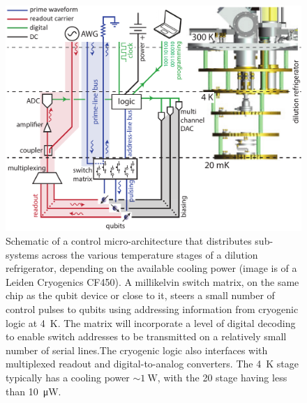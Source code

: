 \begin{figure}
\centering
\includegraphics[width=0.8\linewidth]{Fig1_arch}
\caption[Schematic of a control micro-architecture]{\label{fig:DRstages}Schematic of a control micro-architecture that distributes sub-systems across the various temperature stages of a dilution refrigerator, depending on the available cooling power (image is of a Leiden Cryogenics CF450). A millikelvin switch matrix, on the same chip as the qubit device or close to it, steers a small number of control pulses to qubits using addressing information from cryogenic logic at \SI{4}{\kelvin}. The matrix will incorporate a level of digital decoding to enable switch addresses to be transmitted on a relatively small number of serial lines.The cryogenic logic also interfaces with multiplexed readout and digital-to-analog converters. The \SI{4}{\kelvin} stage typically has a cooling power $\sim \SI{1}{\watt}$, with the \SI{20}{\mk} stage having less than \SI{10}{\micro\watt}.}
\end{figure}

